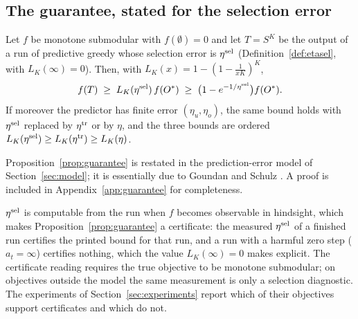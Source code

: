 \subsection{The guarantee, stated for the selection error}\label{sec:guarantee}

\begin{proposition}\label{prop:guarantee}
Let $f$ be monotone submodular with $f(\emptyset)=0$ and let $T=S^{K}$ be the
output of a run of predictive greedy whose selection error is $\eta^{\mathrm{sel}}$
(Definition~\ref{def:etasel}, with $L_K(\infty)=0$).
Then, with $L_K(x)=1-(1-\tfrac1{xK})^{K}$,
\[
  f(T)\;\ge\;L_K(\eta^{\mathrm{sel}})\,f(O^{\ast})
  \;\ge\;\bigl(1-e^{-1/\eta^{\mathrm{sel}}}\bigr)f(O^{\ast}).
\]
If moreover the predictor has finite error $(\eta_u,\eta_o)$, the same bound
holds with $\eta^{\mathrm{sel}}$ replaced by $\eta^{\mathrm{tr}}$ or by $\eta$, and the three bounds
are ordered $L_K(\eta^{\mathrm{sel}})\ge L_K(\eta^{\mathrm{tr}})\ge L_K(\eta)$.
\end{proposition}
Proposition~\ref{prop:guarantee} is restated in the prediction-error model of
Section~\ref{sec:model}; it is essentially due to Goundan and Schulz
\citep[Theorem~1]{goundan2007revisiting}.  A proof is included in
Appendix~\ref{app:guarantee} for completeness.

\begin{remark}\label{rem:etasel-measurable}
$\eta^{\mathrm{sel}}$ is computable from the run when $f$ becomes observable in
hindsight, which makes Proposition~\ref{prop:guarantee} a certificate: the
measured $\eta^{\mathrm{sel}}$ of a finished run certifies the printed bound for that
run, and a run with a harmful zero step ($a_t=\infty$) certifies nothing,
which the value $L_K(\infty)=0$ makes explicit.  The certificate reading
requires the true objective to be monotone submodular; on objectives
outside the model the same measurement is only a selection diagnostic.
The experiments of Section~\ref{sec:experiments} report which of their
objectives support certificates and which do not.
\end{remark}

